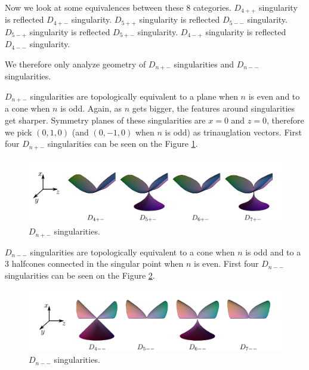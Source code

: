 Now we look at some equivalences between these 8 categories.
$D_{4++}$ singularity is reflected $D_{4+-}$ singularity.
$D_{5++}$ singularity is reflected $D_{5--}$ singularity.
$D_{5-+}$ singularity is reflected $D_{5+-}$ singularity.
$D_{4-+}$ singularity is reflected $D_{4--}$ singularity.

We therefore only analyze geometry of $D_{n+-}$ singularities and
$D_{n--}$ singularities.

$D_{n+-}$ singularities are topologically equivalent to a plane when $n$ is
even and to a cone when $n$ is odd. Again, as $n$ gets bigger, the features
around singularities get sharper. Symmetry planes of these singularities
are $x=0$ and $z=0$, therefore we pick $(0, 1, 0)$ (and $(0, -1, 0)$ when $n$ is odd)
as trinauglation vectors. First four $D_{n+-}$ singularities can be seen on
the Figure \ref{img:7}.

\begin{figure}
    \centerline{\includegraphics[scale=0.5]{images/img7}}
    \caption[$D_{n+-}$ singularities]
    {$D_{n+-}$ singularities. \cite{singsurf}}
    \label{img:7}
\end{figure}


$D_{n--}$ singularities are topologically equivalent to a cone when $n$ is
odd and to a 3 halfcones connected in the singular point when $n$ is even.
First four $D_{n--}$ singularities can be seen on the Figure \ref{img:8}.

\begin{figure}
    \centerline{\includegraphics[scale=0.5]{images/img8}}
    \caption[$D_{n--}$ singularities]
    {$D_{n--}$ singularities. \cite{singsurf}}
    \label{img:8}
\end{figure}

